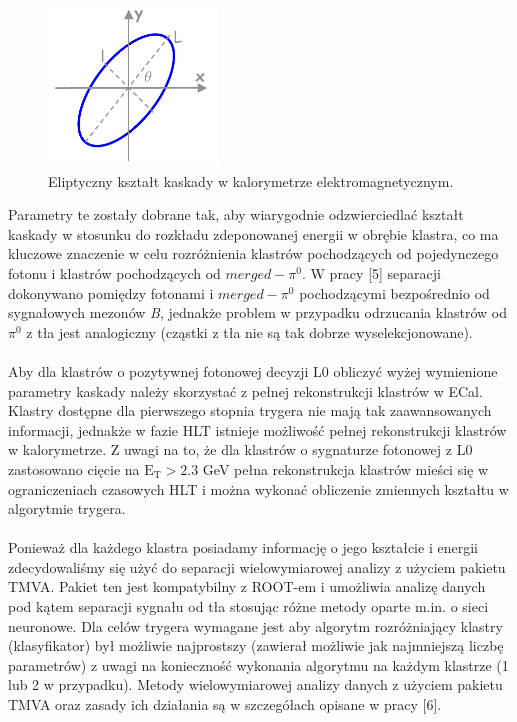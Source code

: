 \documentclass{pracamgr}
\begin{document}
\begin{figure}[!h]
 \centering
 \includegraphics[width=0.4\textwidth]{rysunki/shape.png}
 \caption{Eliptyczny kształt kaskady w kalorymetrze elektromagnetycznym.}
\end{figure}

\noindent
Parametry te zostały dobrane tak, aby wiarygodnie odzwierciedlać kształt kaskady w stosunku do rozkładu zdeponowanej energii w obrębie klastra, co ma kluczowe znaczenie w celu rozróżnienia klastrów pochodzących od pojedynczego fotonu i klastrów pochodzących od $merged-\pi^0$. W pracy [5] separacji dokonywano pomiędzy fotonami i $merged-\pi^0$ pochodzącymi bezpośrednio od sygnałowych mezonów \textit{B}, jednakże problem w przypadku odrzucania klastrów od $\pi^0$ z tła jest analogiczny (cząstki z tła nie są tak dobrze wyselekcjonowane).
\\\\
\noindent
Aby dla klastrów o pozytywnej fotonowej decyzji L0 obliczyć wyżej wymienione parametry kaskady należy skorzystać z pełnej rekonstrukcji klastrów w ECal. Klastry dostępne dla pierwszego stopnia trygera nie mają tak zaawansowanych informacji, jednakże w fazie HLT istnieje możliwość pełnej rekonstrukcji klastrów w kalorymetrze. Z uwagi na to, że dla klastrów o sygnaturze fotonowej z L0 zastosowano cięcie na $\mathrm{E_T>2.3}$ GeV pełna rekonstrukcja klastrów mieści się w ograniczeniach czasowych HLT i można wykonać obliczenie zmiennych kształtu w algorytmie trygera.
\\\\
\noindent
Ponieważ dla każdego klastra posiadamy informację o jego kształcie i energii zdecydowaliśmy się użyć do separacji wielowymiarowej analizy z użyciem pakietu TMVA. Pakiet ten jest kompatybilny z ROOT-em i umożliwia analizę danych pod kątem separacji sygnału od tła stosując różne metody oparte m.in. o sieci neuronowe. Dla celów trygera wymagane jest aby algorytm rozróżniający klastry (klasyfikator) był możliwie najprostszy (zawierał możliwie jak najmniejszą liczbę parametrów) z uwagi na konieczność wykonania algorytmu na każdym klastrze (1 lub 2 w przypadku). Metody wielowymiarowej analizy danych z użyciem pakietu TMVA oraz zasady ich działania są w szczegółach opisane w pracy [6]. 
\end{document}
